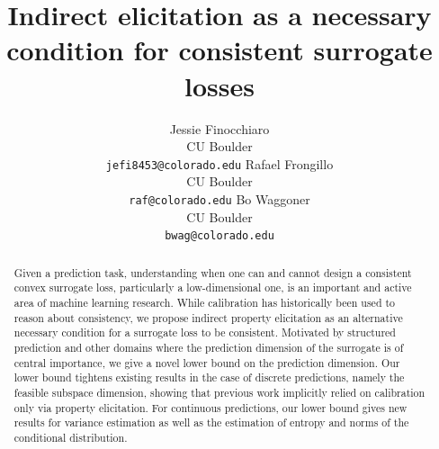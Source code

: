 \documentclass{article}
\title{Indirect elicitation as a necessary condition for consistent surrogate losses}
\author{%
  Jessie Finocchiaro\\
  CU Boulder\\
  \texttt{jefi8453@colorado.edu} 
  \And
   Rafael Frongillo\\
   CU Boulder\\
   \texttt{raf@colorado.edu} 
   \And
   Bo Waggoner\\
   CU Boulder \\
   \texttt{bwag@colorado.edu} 
}
\begin{document}
\maketitle

\begin{abstract}
Given a prediction task, understanding when one can and cannot design a consistent convex surrogate loss, particularly a low-dimensional one, is an important and active area of machine learning research. 
While calibration has historically been used to reason about consistency, we propose indirect property elicitation as an alternative necessary condition for a surrogate loss to be consistent. 
Motivated by structured prediction and other domains where the prediction dimension of the surrogate is of central importance, we give a novel lower bound on the prediction dimension. 
Our lower bound tightens existing results in the case of discrete predictions, namely the feasible subspace dimension, showing that previous work implicitly relied on calibration only via property elicitation. 
For continuous predictions, our lower bound gives new results for variance estimation as well as the estimation of entropy and norms of the conditional distribution.
\end{abstract}
\end{document}
